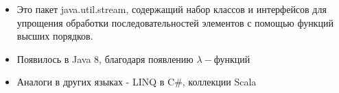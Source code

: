 \begin{frame}
\frametitle{\insertsection} 
\framesubtitle{\insertsubsection}
\begin{itemize}
	\item Это пакет java.util.stream, содержащий набор классов и интерфейсов для упрощения обработки последовательностей элементов с помощью функций высших порядков.
	\item Появилось в Java 8, благодаря появлению $\lambda-$функций
	\item Аналоги в других языках - LINQ в C\#, коллекции Scala
\end{itemize}
\end{frame}